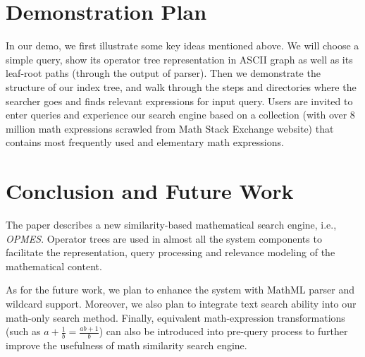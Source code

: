 \documentclass{llncs}
\begin{document}
\section{Demonstration Plan}
In our demo, we first illustrate some key ideas mentioned above.
 We will choose a simple query, show its operator tree representation in ASCII graph as well as its leaf-root paths (through the output of parser).
 Then we demonstrate the structure of our index tree, and walk through the steps and directories where the searcher goes and finds relevant expressions for input query.
 Users are invited to enter queries and experience our search engine based on a collection (with over 8 million math expressions scrawled from Math Stack Exchange website) that contains most frequently used and elementary math expressions.

\section{Conclusion and Future Work}

The paper describes a new similarity-based mathematical search engine, i.e., {\em OPMES}. 
Operator trees are used in almost all the system components to facilitate 
the representation, query processing and relevance modeling of the mathematical content. 

As for the future work, we plan to enhance the system with 
MathML parser and wildcard support.  Moreover, we also plan to 
integrate text search ability into our math-only search method. 
Finally, equivalent math-expression transformations (such as $a+\frac 1 b = \frac{ab + 1}b$) can also be introduced into pre-query process to further improve the usefulness of math similarity search engine.



\end{document}

